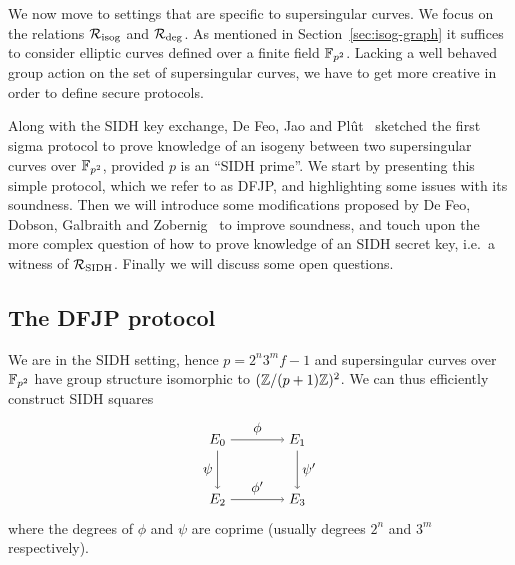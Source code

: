 

We now move to settings that are specific to supersingular curves.
We focus on the relations $\R[isog]$ and $\R[deg]$.
As mentioned in Section~\ref{sec:isog-graph} it suffices to consider elliptic curves defined over a finite field $\F_{p^2}$.
Lacking a well behaved group action on the set of supersingular curves, we have to get more creative in order to define secure protocols.

Along with the SIDH key exchange, De Feo, Jao and Pl\^{u}t~\cite{DFJP14} sketched the first sigma protocol to prove knowledge of an isogeny between two supersingular curves over $\F_{p^2}$, provided $p$ is an ``SIDH prime''.
We start by presenting this simple protocol, which we refer to as DFJP, and highlighting some issues with its soundness.
Then we will introduce some modifications proposed by De Feo, Dobson, Galbraith and Zobernig~\cite{DFDGZ21} to improve soundness, and touch upon the more complex question of how to prove knowledge of an SIDH secret key, i.e.\ a witness of $\R[SIDH]$.
Finally we will discuss some open questions.


\subsection{The DFJP protocol}\label{sec:DFJP}

We are in the SIDH setting, hence $p = 2^n 3^m f - 1$ and supersingular curves over $\F_{p^2}$ have group structure isomorphic to $(\Z/(p+1)\Z)^2$.
We can thus efficiently construct SIDH squares
%
\begin{equation}
    \label{eq:sidh-pok}
    \tikz[x=2cm,y=-1.5cm,baseline=-.75cm]{
    \node (E0) at (0,0) {$E_0$};
    \node (E1) at (1,0) {$E_1$};
    \node (E2) at (0,1) {$E_2$};
    \node (E3) at (1,1) {$E_3$};
    \draw[->] (E0) edge node[above] {$\phi$} (E1)
    (E0) edge node[left] {$\psi$} (E2)
    (E1) edge node[right] {$\psi'$} (E3)
    (E2) edge node[above] {$\phi'$} (E3);
    }
\end{equation}
%
where the degrees of $\phi$ and $\psi$ are coprime (usually degrees $2^n$ and $3^m$ respectively).


